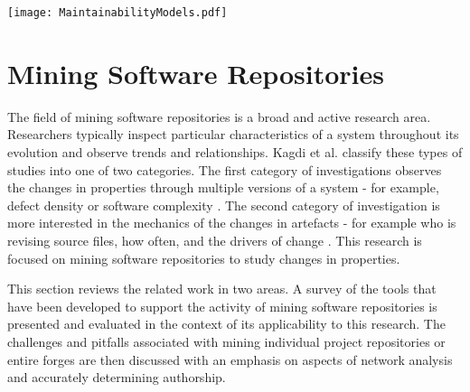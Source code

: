 \begin{table}
\begin{tabular}
\centering 
\texttt{[image: MaintainabilityModels.pdf]}
\label{tab:MaintainabilityModels}
\end{tabular}
\end{table}

\section{Mining Software Repositories} %
The field of mining software repositories is a broad and active research area. Researchers typically inspect particular characteristics of a system throughout its evolution and observe trends and relationships. Kagdi et al. \citep{kagdi2007survey} classify these types of studies into one of two categories. The first category of investigations observes the changes in properties through multiple versions of a system - for example, defect density or software complexity \citep{yamashita2017software, agrawal2018we, tian2018statistical}. The second category of investigation is more interested in the mechanics of the changes in artefacts - for example who is revising source files, how often, and the drivers of change \citep{lee2017understanding, ortu2018mining}. This research is focused on mining software repositories to study changes in properties.

This section reviews the related work in two areas. A survey of the tools that have been developed to support the activity of mining software repositories is presented and evaluated in the context of its applicability to this research. The challenges and pitfalls associated with mining individual project repositories or entire forges are then discussed with an emphasis on aspects of network analysis and accurately determining authorship.

